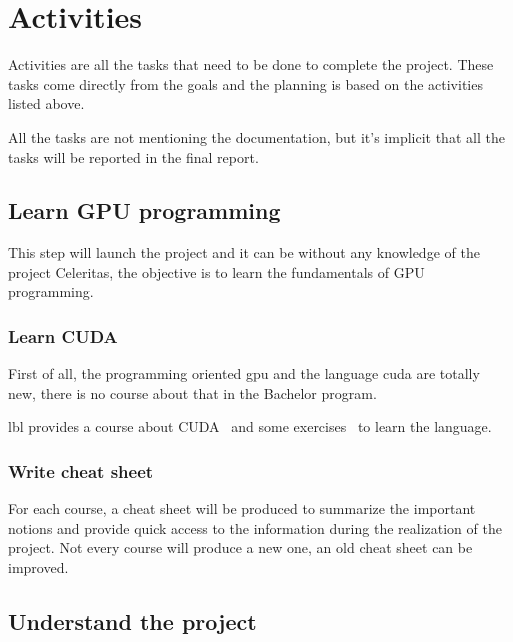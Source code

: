 \chapter{Activities}
\label{spec:ch:activities}

Activities are all the tasks that need to be done to complete the project.
These tasks come directly from the goals and the planning is based on the activities listed above.

All the tasks are not mentioning the documentation, but it's implicit that all the tasks will be reported in the final report.

\section{Learn GPU programming}
\label{spec:ch:activities:learn-gpu-programming}

This step will launch the project and it can be without any knowledge of the project Celeritas, the objective is to learn the fundamentals of GPU programming.


\subsection{Learn CUDA}
\label{spec:ch:activities:learn-gpu-programming:learn-cuda}

First of all, the programming oriented \acrshort{gpu} and the language \acrshort{cuda} are totally new, there is no course about that in the Bachelor program.

\acrlong{lbl} provides a course about CUDA~\cite{cuda-training} and some exercises~\cite{cuda-series} to learn the language.


\subsection{Write cheat sheet}
\label{spec:spec:ch:activities:learn-gpu-programming:write-cheat-sheet}

For each course, a cheat sheet will be produced to summarize the important notions and provide quick access to the information during the realization of the project.
Not every course will produce a new one, an old cheat sheet can be improved.


\section{Understand the project}
\label{spec:ch:activities:understand-the-project}


